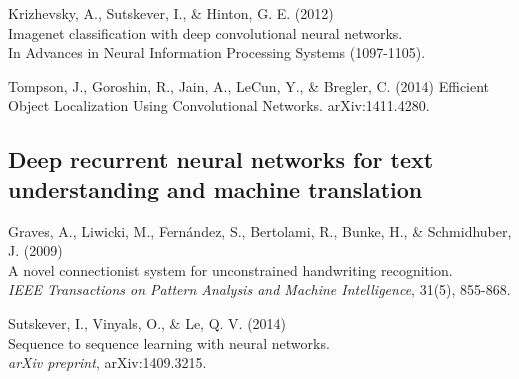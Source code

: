 \documentclass[]{article}
\begin{document}

Krizhevsky, A., Sutskever, I., \& Hinton, G. E. (2012)\\ Imagenet
classification with deep convolutional neural networks.\\ In Advances in
Neural Information Processing Systems (1097-1105).



Tompson, J., Goroshin, R., Jain, A., LeCun, Y., \& Bregler, C. (2014)
Efficient Object Localization Using Convolutional
Networks. arXiv:1411.4280.


\subsection{Deep recurrent neural networks for text understanding and machine translation}

Graves, A., Liwicki, M., Fernández, S., Bertolami, R., Bunke, H., \&
Schmidhuber, J. (2009)\\ A novel connectionist system for unconstrained
handwriting recognition.\\ {\it IEEE Transactions on Pattern Analysis and
  Machine Intelligence}, 31(5), 855-868.


Sutskever, I., Vinyals, O., \& Le, Q. V. (2014)\\ Sequence to sequence
learning with neural networks.\\ {\it arXiv preprint}, arXiv:1409.3215.
\end{document}
